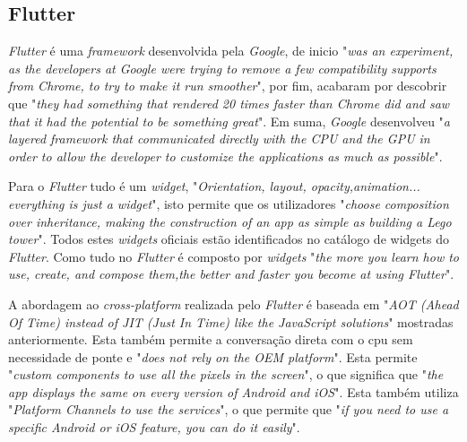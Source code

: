 \subsection{Flutter}
\textit{Flutter} é uma \textit{framework} desenvolvida pela \textit{Google}, de inicio "\emph{was an experiment, as the developers at Google were trying to remove a few compatibility supports from Chrome, to try to make it run smoother}"\citep{flutter}, por fim, acabaram por descobrir que "\emph{they had something that rendered 20 times faster than Chrome did and saw that it had the potential to be something great}"\citep{flutter}. Em suma, \textit{Google} desenvolveu "\emph{a layered framework that communicated directly with the CPU and the GPU in order to allow the developer to customize the applications as much as possible}"\citep{flutter}.

Para o \textit{Flutter} tudo é um \textit{widget}, "\emph{Orientation, layout, opacity,animation... everything is just a widget}"\citep{flutter}, isto permite que os utilizadores "\emph{choose composition over inheritance, making the construction of an app as simple as building a Lego tower}"\citep{flutter}. Todos estes \textit{widgets} oficiais estão identificados no catálogo de widgets do \textit{Flutter}. Como tudo no \textit{Flutter} é composto por \textit{widgets} "\emph{the more you learn how to use, create, and compose them,the better and faster you become at using Flutter}"\citep{flutter}.

A abordagem ao \textit{cross-platform} realizada pelo \textit{Flutter} é baseada em "\emph{AOT (Ahead Of Time) instead of JIT (Just In Time) like the JavaScript solutions}"\citep{flutter} mostradas anteriormente. Esta também permite a conversação direta com o cpu sem necessidade de ponte e "\emph{does not rely on the OEM platform}"\citep{flutter}. Esta permite "\emph{custom components to use all the pixels in the screen}"\citep{flutter}, o que significa que "\emph{the app displays the same on every version of Android and iOS}"\citep{flutter}. Esta também utiliza "\emph{Platform Channels to use the services}"\citep{flutter}, o que permite que "\emph{if you need to use a specific Android or iOS feature, you can do it easily}"\citep{flutter}.
